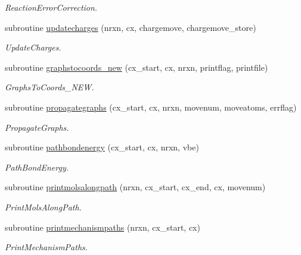 \begin{DoxyCompactItemize}
\begin{DoxyCompactList}\small\item\em Reaction\+Error\+Correction. \end{DoxyCompactList}\item 
subroutine \mbox{\hyperlink{namespacepathfinder_a6163bb10d42d544518d19ae3f48e5a24}{updatecharges}} (nrxn, cx, chargemove, chargemove\+\_\+store)
\begin{DoxyCompactList}\small\item\em Update\+Charges. \end{DoxyCompactList}\item 
subroutine \mbox{\hyperlink{namespacepathfinder_a8e06d604a02f2565abaed3711befb4f3}{graphstocoords\+\_\+new}} (cx\+\_\+start, cx, nrxn, printflag, printfile)
\begin{DoxyCompactList}\small\item\em Graphs\+To\+Coords\+\_\+\+N\+EW. \end{DoxyCompactList}\item 
subroutine \mbox{\hyperlink{namespacepathfinder_adda000dd8f8436b118c46aa8e3205413}{propagategraphs}} (cx\+\_\+start, cx, nrxn, movenum, moveatoms, errflag)
\begin{DoxyCompactList}\small\item\em Propagate\+Graphs. \end{DoxyCompactList}\item 
subroutine \mbox{\hyperlink{namespacepathfinder_a52341df0a1b5efe1b1f65b263667a6b2}{pathbondenergy}} (cx\+\_\+start, cx, nrxn, vbe)
\begin{DoxyCompactList}\small\item\em Path\+Bond\+Energy. \end{DoxyCompactList}\item 
subroutine \mbox{\hyperlink{namespacepathfinder_a571d6f1c2ef923b3f058c761f8b2080c}{printmolsalongpath}} (nrxn, cx\+\_\+start, cx\+\_\+end, cx, movenum)
\begin{DoxyCompactList}\small\item\em Print\+Mols\+Along\+Path. \end{DoxyCompactList}\item 
subroutine \mbox{\hyperlink{namespacepathfinder_a7afe472ec7144349a286bb38d261b0db}{printmechanismpaths}} (nrxn, cx\+\_\+start, cx)
\begin{DoxyCompactList}\small\item\em Print\+Mechanism\+Paths. \end{DoxyCompactList}\item 

\end{DoxyCompactItemize}
